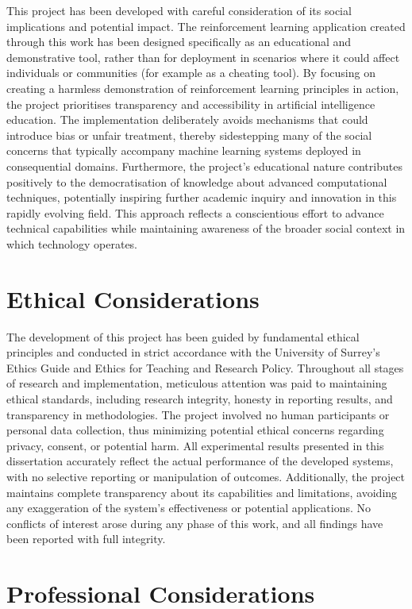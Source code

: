 This project has been developed with careful consideration of its social implications and potential impact. 
The reinforcement learning application created through this work has been designed specifically as an educational and demonstrative tool, rather than for deployment in scenarios where it could affect individuals or communities (for example as a cheating tool). 
By focusing on creating a harmless demonstration of reinforcement learning principles in action, the project prioritises transparency and accessibility in artificial intelligence education. 
The implementation deliberately avoids mechanisms that could introduce bias or unfair treatment, thereby sidestepping many of the social concerns that typically accompany machine learning systems deployed in consequential domains. 
Furthermore, the project's educational nature contributes positively to the democratisation of knowledge about advanced computational techniques, potentially inspiring further academic inquiry and innovation in this rapidly evolving field. 
This approach reflects a conscientious effort to advance technical capabilities while maintaining awareness of the broader social context in which technology operates.

\section{Ethical Considerations}

The development of this project has been guided by fundamental ethical principles and conducted in strict accordance with the University of Surrey's Ethics Guide and Ethics for Teaching and Research Policy. 
Throughout all stages of research and implementation, meticulous attention was paid to maintaining ethical standards, including research integrity, honesty in reporting results, and transparency in methodologies. 
The project involved no human participants or personal data collection, thus minimizing potential ethical concerns regarding privacy, consent, or potential harm.
All experimental results presented in this dissertation accurately reflect the actual performance of the developed systems, with no selective reporting or manipulation of outcomes. 
Additionally, the project maintains complete transparency about its capabilities and limitations, avoiding any exaggeration of the system's effectiveness or potential applications. 
No conflicts of interest arose during any phase of this work, and all findings have been reported with full integrity.

\section{Professional Considerations}

